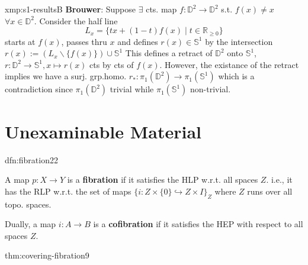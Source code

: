 \documentclass[landscape, 8pt]{extarticle}
\begin{document}
\begin{multicols*}{3}
\begin{xmp}{xmp:s1-results}{B}
	\textbf{Brouwer}: Suppose $\exists$ cts. map $f : \mathbb{D}^{2} \to \mathbb{D}^{2}$ s.t. $f(x) \ne x$ $\forall x \in \mathbb{D}^{2}$. Consider the half line
	\[L_{x} = \{tx + (1 - t) f(x) \mid t\in \mathbb{R}_{\ge 0}\}\]
	starts at $f(x)$, passes thru $x$ and defines $r(x)\in \mathbb{S}^{1}$ by the intersection $r(x) := (L_{x} \backslash \{f(x)\}) \cup \mathbb{S}^{1}$ This defines a retract of $\mathbb{D}^{2}$ onto $\mathbb{S}^{1}$, $r : \mathbb{D}^{2} \to \mathbb{S}^{1}, x \mapsto r(x)$ cts by cts of $f(x)$. However, the existance of the retract implies we have a surj. grp.homo. $r_{\ast} : \pi_{1}(\mathbb{D}^{2}) \to \pi_{1}(\mathbb{S}^{1})$ which is a contradiction since $\pi_{1}(\mathbb{D}^{2})$ trivial while $\pi_{1}(\mathbb{S}^{1})$ non-trivial.
\end{xmp}

\newpage
\section{Unexaminable Material}
\begin{dfn}[Fibration]{dfn:fibration}{22}
	\vspace{-2pt}
	\begin{enumerate-zero}
	    \item A map $p : X \to Y$ is a \textbf{fibration} if it satisfies the HLP w.r.t. all spaces $Z$. i.e., it has the RLP w.r.t. the set of maps $\{ i : Z \times \{0\} \hookrightarrow Z \times I\}_{Z}$ where $Z$ runs over all topo. spaces.
	    \item Dually, a map $i : A \to B$ is a \textbf{cofibration} if it satisfies the HEP with respect to all spaces $Z$.
	\end{enumerate-zero}
\end{dfn}

\begin{thm}{thm:covering-fibration}{9}
\end{thm}


\end{multicols*}
\end{document}
